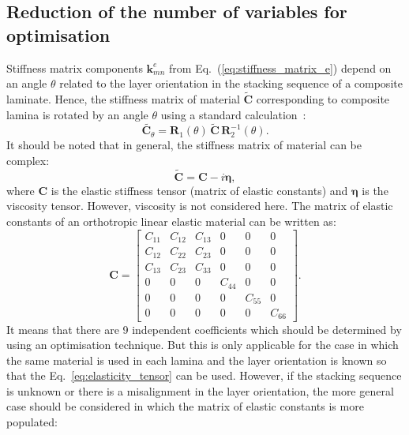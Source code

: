 \documentclass[preprint,12pt]{elsarticle}
\newcommand{\matr}[1]{\mathbf{#1}} %
\newcommand{\bs}[1]{\boldsymbol{#1}}
\begin{document}
 \subsection{Reduction of the number of variables for optimisation}
 Stiffness matrix components $\matr{k}_{mn}^e$ from Eq.~(\ref{eq:stiffness_matrix_e}) depend on an angle $\theta$ related to the layer orientation in the stacking sequence of a composite laminate. Hence, the stiffness matrix of material $\tilde{\matr{C}}$ corresponding to composite lamina is rotated by an angle $\theta$ using a standard calculation~\cite{Bartoli2006,Taupin2011}:
 \begin{equation}
	\tilde{ \matr{C}_{\theta}}= \matr{R}_1(\theta) \,\tilde{\matr{C}} \,\matr{R}_2^{-1}(\theta).
	 \label{eq:elasticity_tensor}
 \end{equation}
 It should be noted that in general, the stiffness matrix of material can be complex:
 \begin{equation}
 \tilde{\matr{C}}= \matr{C} - i \bs{\eta},
 \label{eq:complex_elasticity_tensor}
 \end{equation}
 where $\matr{C} $ is the elastic stiffness tensor (matrix of elastic constants) and $\bs{\eta}$ is the viscosity tensor. However, viscosity is not considered here. The matrix of elastic constants of an orthotropic linear elastic material can be written as:
 \begin{equation}
 \matr{C} = \left[\begin{array}{cccccc} C_{11} & C_{12}& C_{13} & 0&0&0\\[2pt]
 C_{12}& C_{22} & C_{23}& 0&0&0\\[2pt]
 C_{13}&C_{23}&C_{33}&0&0&0\\[2pt]
 0& 0 &0&C_{44}& 0&0\\[2pt]
 0&0&0&0&C_{55}&0\\[2pt]
  0&0&0&0&0&C_{66}
  \end{array}\right]. 
  \label{eq:elastic_constatns}
 \end{equation} 
 It means that there are 9 independent coefficients which should be determined by using an optimisation technique. But this is only applicable for the case in which the same material is used in each lamina and the layer orientation is known so that the Eq.~\ref{eq:elasticity_tensor} can be used. However, if the stacking sequence is unknown or there is a misalignment in the layer orientation, the more general case should be considered in which the matrix of elastic constants is more populated:
\end{document}
